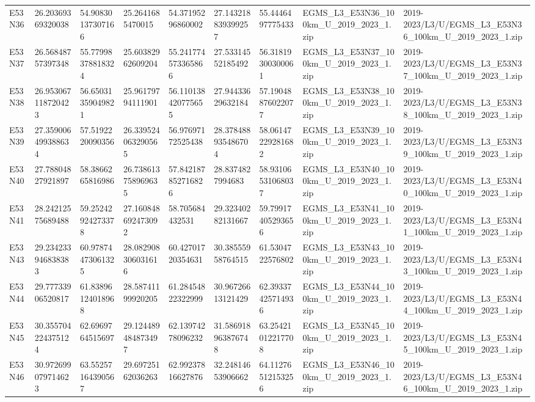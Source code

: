 \begin{landscape}
\begin{longtable}{lllllllll}
E53N36 & 26.20369369320038 & 54.90830137307166 & 25.2641685470015 & 54.37195296860002 & 27.143218839399257 & 55.4446497775433 & EGMS\_L3\_E53N36\_100km\_U\_2019\_2023\_1.zip & 2019-2023/L3/U/EGMS\_L3\_E53N36\_100km\_U\_2019\_2023\_1.zip \\
E53N37 & 26.56848757397348 & 55.77998378818324 & 25.60382962609204 & 55.241774573365866 & 27.53314552185492 & 56.31819300300061 & EGMS\_L3\_E53N37\_100km\_U\_2019\_2023\_1.zip & 2019-2023/L3/U/EGMS\_L3\_E53N37\_100km\_U\_2019\_2023\_1.zip \\
E53N38 & 26.953067118720423 & 56.65031359049821 & 25.96179794111901 & 56.110138420775655 & 27.94433629632184 & 57.19048876022077 & EGMS\_L3\_E53N38\_100km\_U\_2019\_2023\_1.zip & 2019-2023/L3/U/EGMS\_L3\_E53N38\_100km\_U\_2019\_2023\_1.zip \\
E53N39 & 27.359006499388634 & 57.5192220090356 & 26.339524063290565 & 56.97697172525438 & 28.378488935486704 & 58.06147229281682 & EGMS\_L3\_E53N39\_100km\_U\_2019\_2023\_1.zip & 2019-2023/L3/U/EGMS\_L3\_E53N39\_100km\_U\_2019\_2023\_1.zip \\
E53N40 & 27.78804827921897 & 58.3866265816986 & 26.738613758969635 & 57.842187852716826 & 28.8374827994683 & 58.93106531068037 & EGMS\_L3\_E53N40\_100km\_U\_2019\_2023\_1.zip & 2019-2023/L3/U/EGMS\_L3\_E53N40\_100km\_U\_2019\_2023\_1.zip \\
E53N41 & 28.24212575689488 & 59.25242924273378 & 27.160848692473092 & 58.705684432531 & 29.32340282131667 & 59.79917405293656 & EGMS\_L3\_E53N41\_100km\_U\_2019\_2023\_1.zip & 2019-2023/L3/U/EGMS\_L3\_E53N41\_100km\_U\_2019\_2023\_1.zip \\
E53N43 & 29.234233946838383 & 60.97874473061325 & 28.082908306031616 & 60.42701720354631 & 30.38555958764515 & 61.5304722576802 & EGMS\_L3\_E53N43\_100km\_U\_2019\_2023\_1.zip & 2019-2023/L3/U/EGMS\_L3\_E53N43\_100km\_U\_2019\_2023\_1.zip \\
E53N44 & 29.77733906520817 & 61.83896124018968 & 28.58741199920205 & 61.28454822322999 & 30.96726613121429 & 62.39337425714936 & EGMS\_L3\_E53N44\_100km\_U\_2019\_2023\_1.zip & 2019-2023/L3/U/EGMS\_L3\_E53N44\_100km\_U\_2019\_2023\_1.zip \\
E53N45 & 30.355704224375124 & 62.6969764515697 & 29.124489484873497 & 62.13974278096232 & 31.586918963876748 & 63.25421012217708 & EGMS\_L3\_E53N45\_100km\_U\_2019\_2023\_1.zip & 2019-2023/L3/U/EGMS\_L3\_E53N45\_100km\_U\_2019\_2023\_1.zip \\
E53N46 & 30.972699079714623 & 63.55257164390567 & 29.69725162036263 & 62.99237816627876 & 32.24814653906662 & 64.11276512153256 & EGMS\_L3\_E53N46\_100km\_U\_2019\_2023\_1.zip & 2019-2023/L3/U/EGMS\_L3\_E53N46\_100km\_U\_2019\_2023\_1.zip \\

\end{longtable}
\end{landscape}
